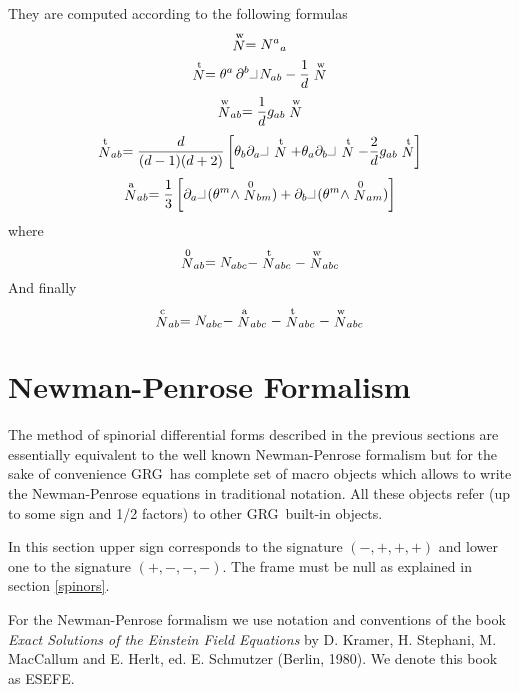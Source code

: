 \documentclass[twoside,openright]{report}
\newcommand{\ipr}{\rule{1.8mm}{.1mm}\rule{.1mm}{2.2mm}\,} %
\newcommand{\pref}[1]{page \pageref{#1}}
\newcommand{\seethis}[1]{\marginpar{\footnotesize\it #1}}
\newcommand{\grg}{{\sc GRG}}
\begin{document}
They are computed according to the following formulas
\begin{equation}
\stackrel{\rm w}{N} = N^a{}_a
\end{equation}
\begin{equation}
\stackrel{\rm t}{N} = \theta^a\,\partial^b\ipr N_{ab}
- \frac{1}{d} \stackrel{\rm w}{N}
\end{equation}
\begin{equation}
\stackrel{\rm w}{N}_{ab} = \frac{1}{d}g_{ab}\stackrel{\rm w}{N}
\end{equation}
\begin{equation}
\stackrel{\rm t}{N}_{ab}=\frac{d}{(d-1)(d+2)}\left[
\theta_b\partial_a\ipr\stackrel{\rm t}{N}
+\theta_a\partial_b\ipr\stackrel{\rm t}{N}
-\frac{2}{d} g_{ab} \stackrel{\rm t}{N}\right]
\end{equation}
\begin{equation}
\stackrel{\rm a}{N}_{ab}=\frac{1}{3}\left[
\partial_a\ipr(\theta^m\wedge\stackrel{0}{N}_{bm})
+\partial_b\ipr(\theta^m\wedge\stackrel{0}{N}_{am})\right]
\end{equation}
where
\[
\stackrel{\rm 0}{N}_{ab}=
N_{abc}
-\stackrel{\rm t}{N}_{abc}
-\stackrel{\rm w}{N}_{abc}
\]
And finally
\begin{equation}
\stackrel{\rm c}{N}_{ab}=
N_{abc}
-\stackrel{\rm a}{N}_{abc}
-\stackrel{\rm t}{N}_{abc}
-\stackrel{\rm w}{N}_{abc}
\end{equation}

\section{Newman-Penrose Formalism}

The method of spinorial differential forms described in the
previous sections are essentially equivalent to the well
known Newman-Penrose formalism but for the sake of convenience
\grg\ has complete set of macro objects which allows to
write the Newman-Penrose equations in
traditional notation. All these objects refer (up to some sign
and 1/2 factors) to other \grg\ built-in objects.

In this section upper sign corresponds to the
signature ${\scriptstyle(-,+,+,+)}$ and lower one to the
signature ${\scriptstyle(+,-,-,-)}$.
\seethis{See \pref{spinors}.}
The frame must be null as explained in section \ref{spinors}.

For the Newman-Penrose formalism we use notation and conventions
of the book \emph{Exact Solutions of the Einstein Field Equations}
by D. Kramer, H. Stephani, M. MacCallum and E. Herlt, ed.
E. Schmutzer (Berlin, 1980). We denote this book as ESEFE.
\end{document}
